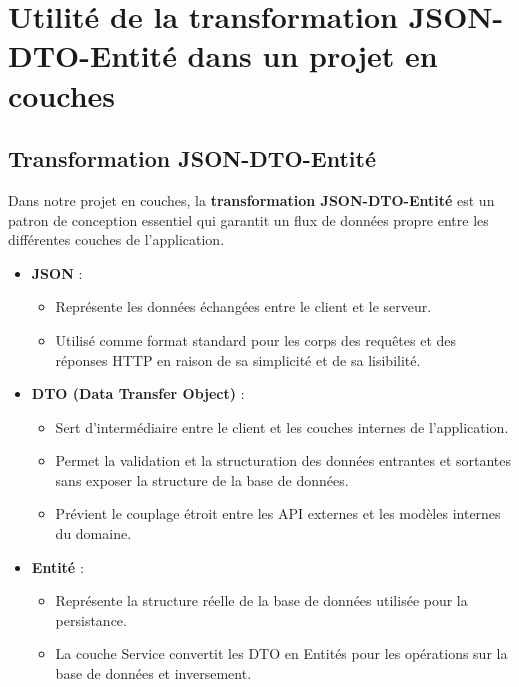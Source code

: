 \documentclass[a4paper,12pt]{article}
\begin{document}
\section{Utilité de la transformation JSON-DTO-Entité dans un projet en couches}

\subsection{Transformation JSON-DTO-Entité}

Dans notre projet en couches, la \textbf{transformation JSON-DTO-Entité} est un patron de conception essentiel qui garantit un flux de données propre entre les différentes couches de l'application.

\begin{itemize}
    \item \textbf{JSON} :
    \begin{itemize}
        \item Représente les données échangées entre le client et le serveur.
        \item Utilisé comme format standard pour les corps des requêtes et des réponses HTTP en raison de sa simplicité et de sa lisibilité.
    \end{itemize}
    \item \textbf{DTO (Data Transfer Object)} :
    \begin{itemize}
        \item Sert d'intermédiaire entre le client et les couches internes de l'application.
        \item Permet la validation et la structuration des données entrantes et sortantes sans exposer la structure de la base de données.
        \item Prévient le couplage étroit entre les API externes et les modèles internes du domaine.
    \end{itemize}
    \item \textbf{Entité} :
    \begin{itemize}
        \item Représente la structure réelle de la base de données utilisée pour la persistance.
        \item La couche Service convertit les DTO en Entités pour les opérations sur la base de données et inversement.
    \end{itemize}
\end{itemize}
\end{document}
